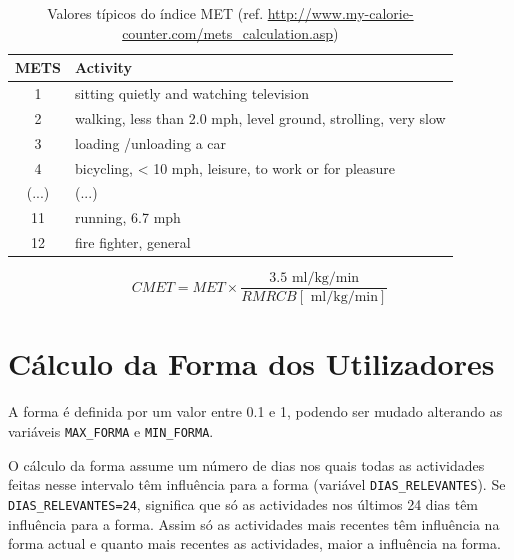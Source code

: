 \documentclass[a4paper,10pt]{report}
\begin{document}
\begin{table}
\caption {Valores típicos do índice MET (ref. \url{http://www.my-calorie-counter.com/mets_calculation.asp})} 
\label{tab:met}
\begin{center}
  \begin{tabular}{| c | l |}
    \hline                       
    METS & Activity\\
    \hline  
    \hline  
    1 & sitting quietly and watching television \\
    \hline  
    2 & walking, less than 2.0 mph, level ground, strolling, very slow \\
    \hline  
    3 & loading /unloading a car\\
    \hline  
    4 & bicycling, < 10 mph, leisure, to work or for pleasure\\
    \hline  
    (...) & (...)\\
    \hline  
    11 & running, 6.7 mph\\
    \hline  
    12 & fire fighter, general\\
    \hline  
  \end{tabular}
\end{center}
\end{table}

\begin{equation} \label{eq:CMET} 
CMET = MET \times \frac{3.5 \text{ ml/kg/min}}{RMRCB [\text{ ml/kg/min}]}
\end{equation}

\newpage
\phantom{placeholder} %
\thispagestyle{empty} %
\chapter{Cálculo da Forma dos Utilizadores}
\label{cap:forma}
A forma é definida por um valor entre 0.1 e 1, podendo ser mudado alterando as variáveis \verb!MAX_FORMA! e \verb!MIN_FORMA!.

O cálculo da forma assume um número de dias nos quais todas as actividades feitas nesse intervalo têm influência para a forma 
(variável \verb!DIAS_RELEVANTES!). Se \verb!DIAS_RELEVANTES=24!, significa que só as actividades nos últimos 24 dias têm influência para a forma.  
Assim só as actividades mais recentes têm influência na forma actual e quanto mais recentes as 
actividades, maior a influência na forma.
\end{document}
